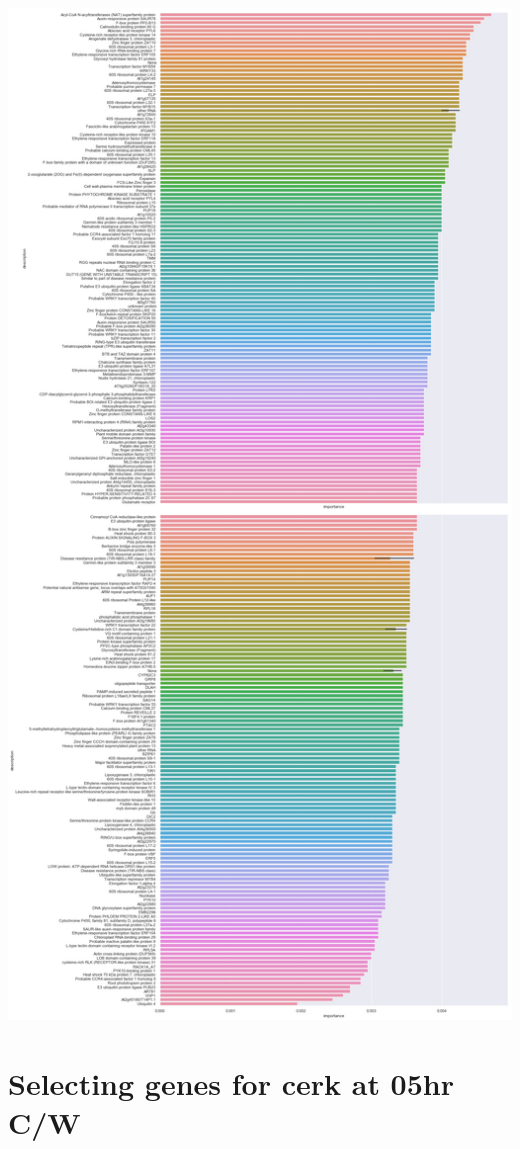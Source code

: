 \documentclass[11pt]{article}
\begin{document}
\begin{center}
\includegraphics[width=.9\linewidth]{obipy-resources/93e2fbf76ed477962282ae99767b8408de4d3ed9/247f3a8ca81edfa728b6d12c14378ecb5bd32480.png}
\end{center}

\section{Selecting genes for cerk at 05hr C/W}
\label{sec:orga881dd9}
\end{document}
